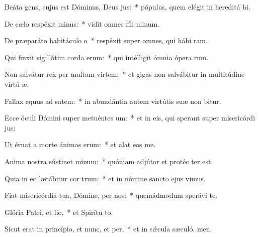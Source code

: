 \item Beáta gens, cujus est Dóminus, Deus jus:~* pópulus, quem elégit in hereditá bi.
\item De cælo respéxit minus:~* vidit omnes fíli minum.
\item De præparáto habitáculo o~* respéxit super omnes, qui hábi ram.
\item Qui finxit sigillátim corda erum:~* qui intélligit ómnia ópera rum.
\item Non salvátur rex per multam virtem:~* et gigas non salvábitur in multitúdine virtú æ.
\item Fallax equus ad satem:~* in abundántia autem virtútis suæ non bitur.
\item Ecce óculi Dómini super metuéntes um:~* et in eis, qui sperant super misericórdi jus:
\item Ut éruat a morte ánimas erum:~* et alat eos  me.
\item Anima nostra sústinet minum:~* quóniam adjútor et protéc ter est.
\item Quia in eo lætábitur cor trum:~* et in nómine sancto ejus vimus.
\item Fiat misericórdia tua, Dómine, per nos:~* quemádmodum sperávi  te.
\item Glória Patri, et lio,~* et Spirítu to.
\item Sicut erat in princípio, et nunc, et per,~* et in sǽcula sæculó. men.
